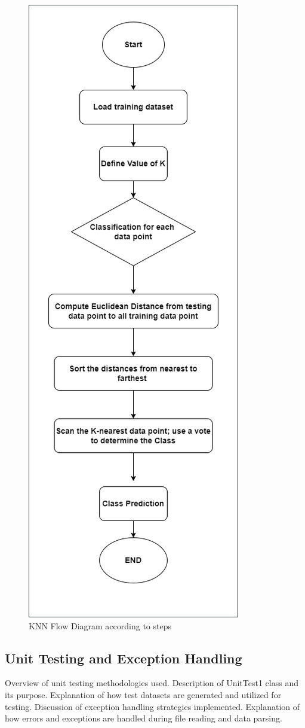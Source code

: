 \documentclass[conference]{IEEEtran}
\begin{document}
\begin{figure}
    \centering
    \includegraphics[width=0.5\linewidth]{KNNClassifier.png}
    \caption{KNN Flow Diagram according to steps}
    \label{fig:enter-label}
\end{figure}




\subsection{Unit Testing and Exception Handling}
Overview of unit testing methodologies used.
Description of UnitTest1 class and its purpose.
Explanation of how test datasets are generated and utilized for testing.
Discussion of exception handling strategies implemented.
Explanation of how errors and exceptions are handled during file reading and data parsing.
\end{document}
